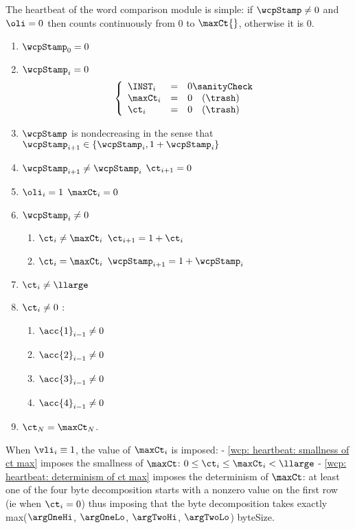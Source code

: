 The heartbeat of the word comparison module is simple: if $\wcpStamp \neq 0$ and $\oli = 0$ then \ct{} counts continuously from $0$ to $\maxCt{}$, otherwise it is $0$.
\begin{enumerate}
	\item $\wcpStamp_{0} = 0$
	\item \If $\wcpStamp_{i} = 0$ \Then
		\[
			\left\{ \begin{array}{lcl}
				\INST_{i}  & = & 0 \sanityCheck   \\
				\maxCt_{i} & = & 0 \quad (\trash) \\
				\ct_{i}    & = & 0 \quad (\trash) \\
			\end{array} \right.
		\]
	\item $\wcpStamp$ is nondecreasing in the sense that $\wcpStamp_{i + 1} \in \{ \wcpStamp_{i}, 1 + \wcpStamp_{i} \}$
	\item \If $\wcpStamp_{i + 1} \neq \wcpStamp_{i}$ \Then $\ct_{i + 1} = 0$
	\item \If $\oli_{i} = 1$ \Then $\maxCt_{i}=0$
	\item \If $\wcpStamp_{i} \neq 0$ \Then
		\begin{enumerate}
			\item \If $\ct_{i} \neq \maxCt_{i}$ \Then $\ct_{i + 1} = 1 + \ct_{i}$
			\item \If $\ct_{i} =    \maxCt_{i}$ \Then $\wcpStamp_{i + 1} = 1 + \wcpStamp_{i}$
		\end{enumerate}
	\label{wcp: heartbeat: smallness of ct max}
	\item $\ct_{i} \neq \llarge$
	\label{wcp: heartbeat: determinism of ct max}
	\item \If $\ct_{i} \neq 0 $ \Then: 
	\begin{enumerate}
			\item \Or $\acc{1}_{i-1} \neq 0$
			\item \Or $\acc{2}_{i-1} \neq 0$
			\item \Or $\acc{3}_{i-1} \neq 0$
			\item \Or $\acc{4}_{i-1} \neq 0$
	\end{enumerate}	
	\item $\ct_{N} = \maxCt_{N}$.
\end{enumerate}
\saNote{} When $\vli_i \equiv 1$, the value of $\maxCt_i$ is imposed:
- \ref{wcp: heartbeat: smallness of ct max} imposes the smallness of $\maxCt$: $0 \leq \ct_{i} \leq \maxCt_{i} < \llarge$
- \ref{wcp: heartbeat: determinism of ct max} imposes the determinism of $\maxCt$: at least one of the four byte decomposition starts with a nonzero value on the first row (ie when $\ct_{i} = 0$) thus imposing that the byte decomposition takes exactly max($\argOneHi$, $\argOneLo$, $\argTwoHi$, $\argTwoLo$) byteSize. 

